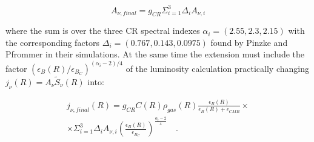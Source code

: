 \documentclass[traditabstract]{aa}
\begin{document}
\begin{appendix}
\begin{equation}
A_{\nu, final} = g_{CR} \Sigma_{i=1}^{3} \Delta_{i} A_{\nu,i}
\end{equation}

where the sum is over the three CR spectral indexes $\alpha_{i}=(2.55,2.3,2.15)$ with the corresponding factors $\Delta_{i} = (0.767, 0.143, 0.0975)$ found by Pinzke and Pfrommer in their simulations. At the same time the extension must include the factor $(\epsilon_{B}(R)/\epsilon_{B_{C}})^{(\alpha_{i}-2)/4}$ of the luminosity calculation practically changing $j_{\nu}(R)=A_{\nu}\tilde{S}_{\nu}(R)$ into: 

\begin{eqnarray}
j_{\nu,final}(R)= g_{CR} C(R) \rho_{gas}(R) \frac{\epsilon_{B}(R)}{\epsilon_{B}(R)+\epsilon_{CMB}} \times \nonumber \\
\times \Sigma_{i=1}^{3} \Delta_{i} A_{\nu,i} \left( \frac{\epsilon_{B}(R)}{\epsilon_{B_{C}}} \right)^{\frac{\alpha_{i}-2}{4}}  \quad .
\end{eqnarray}
 
\end{appendix}
\end{document}
